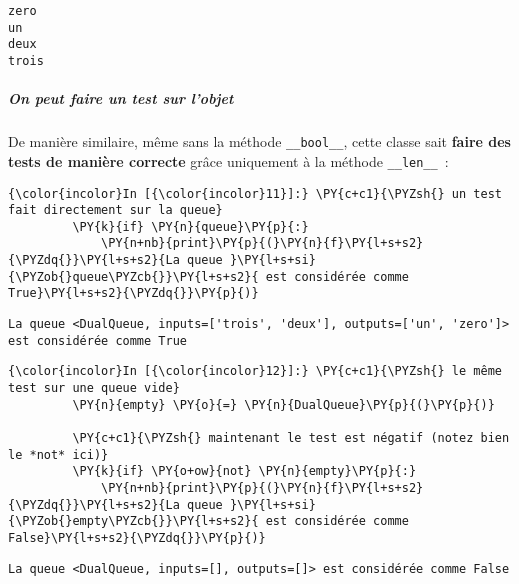     \begin{Verbatim}[commandchars=\\\{\},frame=single,framerule=0.3mm,rulecolor=\color{cellframecolor}]
zero
un
deux
trois
\end{Verbatim}

    \hypertarget{on-peut-faire-un-test-sur-lobjet}{%
\subparagraph{On peut faire un test sur
l'objet}\label{on-peut-faire-un-test-sur-lobjet}}

    De manière similaire, même sans la méthode \texttt{\_\_bool\_\_}, cette
classe sait \textbf{faire des tests de manière correcte} grâce
uniquement à la méthode \texttt{\_\_len\_\_}~:

    \begin{Verbatim}[commandchars=\\\{\},frame=single,framerule=0.3mm,rulecolor=\color{cellframecolor}]
{\color{incolor}In [{\color{incolor}11}]:} \PY{c+c1}{\PYZsh{} un test fait directement sur la queue}
         \PY{k}{if} \PY{n}{queue}\PY{p}{:}
             \PY{n+nb}{print}\PY{p}{(}\PY{n}{f}\PY{l+s+s2}{\PYZdq{}}\PY{l+s+s2}{La queue }\PY{l+s+si}{\PYZob{}queue\PYZcb{}}\PY{l+s+s2}{ est considérée comme True}\PY{l+s+s2}{\PYZdq{}}\PY{p}{)}
\end{Verbatim}


    \begin{Verbatim}[commandchars=\\\{\},frame=single,framerule=0.3mm,rulecolor=\color{cellframecolor}]
La queue <DualQueue, inputs=['trois', 'deux'], outputs=['un', 'zero']> est considérée comme True
\end{Verbatim}

    \begin{Verbatim}[commandchars=\\\{\},frame=single,framerule=0.3mm,rulecolor=\color{cellframecolor}]
{\color{incolor}In [{\color{incolor}12}]:} \PY{c+c1}{\PYZsh{} le même test sur une queue vide}
         \PY{n}{empty} \PY{o}{=} \PY{n}{DualQueue}\PY{p}{(}\PY{p}{)}
         
         \PY{c+c1}{\PYZsh{} maintenant le test est négatif (notez bien le *not* ici)}
         \PY{k}{if} \PY{o+ow}{not} \PY{n}{empty}\PY{p}{:}
             \PY{n+nb}{print}\PY{p}{(}\PY{n}{f}\PY{l+s+s2}{\PYZdq{}}\PY{l+s+s2}{La queue }\PY{l+s+si}{\PYZob{}empty\PYZcb{}}\PY{l+s+s2}{ est considérée comme False}\PY{l+s+s2}{\PYZdq{}}\PY{p}{)}
\end{Verbatim}


    \begin{Verbatim}[commandchars=\\\{\},frame=single,framerule=0.3mm,rulecolor=\color{cellframecolor}]
La queue <DualQueue, inputs=[], outputs=[]> est considérée comme False
\end{Verbatim}

